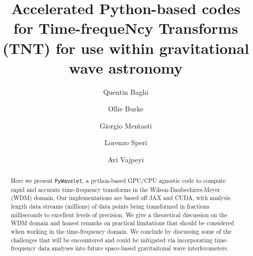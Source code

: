 \documentclass[%
 reprint,
superscriptaddress,
nofootinbib,
 amsmath,amssymb,
 aps,
colorlinks = true, 
linkcolor = blue, 
urlcolor = blue, 
citecolor = blue, 
anchorcolor = blue,
]{revtex4-2}
\newcommand{\ls}[1]{\textcolor{purple}{[Lorenzo: #1]}}
\newcommand{\package}{\texttt{PyWavelet}}
\begin{document}

\title{Accelerated Python-based codes for Time-frequeNcy Transforms (TNT) for use within gravitational wave astronomy}


\author{Quentin Baghi}
\author{Ollie Burke}
\author{Giorgio Mentasti}
\author{Lorenzo Speri}
\author{Avi Vajpeyi}




\begin{abstract}
    Here we present \package, a python-based GPU/CPU agnostic code to compute rapid and accurate time-frequency transforms in the Wilson-Daubechiers-Meyer (WDM) domain. Our implementations are based off JAX and CUDA, with analysis length data streams (millions) of data points being transformed in fractions milliseconds to excellent levels of precision. We give a theoretical discussion on the WDM domain and honest remarks on practical limitations that should be considered when working in the time-frequency domain. We conclude by discussing some of the challenges that will be encountered and could be mitigated via incorporating time-frequency data analyses into future space-based gravitaitonal wave interferometers.
    
\end{abstract}
\end{document}
